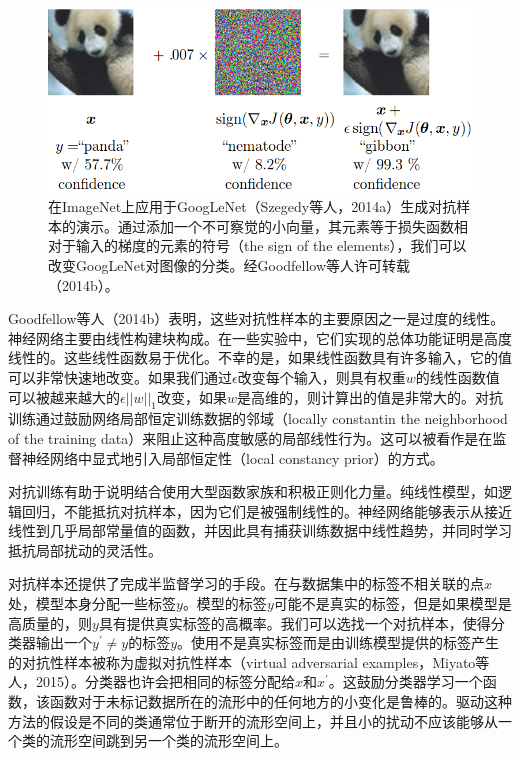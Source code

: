 \begin{figure}[htbp] %
   \centering
   \includegraphics[width=5in]{fig/chap7/7_8.png} 
   \caption{在ImageNet上应用于GoogLeNet（Szegedy等人，2014a）生成对抗样本的演示。通过添加一个不可察觉的小向量，其元素等于损失函数相对于输入的梯度的元素的符号（the sign of the elements），我们可以改变GoogLeNet对图像的分类。经Goodfellow等人许可转载（2014b）。}
   \label{fig:7_8}
\end{figure}

Goodfellow等人（2014b）表明，这些对抗性样本的主要原因之一是过度的线性。神经网络主要由线性构建块构成。在一些实验中，它们实现的总体功能证明是高度线性的。这些线性函数易于优化。不幸的是，如果线性函数具有许多输入，它的值可以非常快速地改变。如果我们通过$\epsilon $改变每个输入，则具有权重$w$的线性函数值可以被越来越大的$\epsilon ||w||_1$改变，如果$w$是高维的，则计算出的值是非常大的。对抗训练通过鼓励网络局部恒定训练数据的邻域（locally constantin the neighborhood of the training data）来阻止这种高度敏感的局部线性行为。这可以被看作是在监督神经网络中显式地引入局部恒定性（local constancy prior）的方式。

对抗训练有助于说明结合使用大型函数家族和积极正则化力量。纯线性模型，如逻辑回归，不能抵抗对抗样本，因为它们是被强制线性的。神经网络能够表示从接近线性到几乎局部常量值的函数，并因此具有捕获训练数据中线性趋势，并同时学习抵抗局部扰动的灵活性。

对抗样本还提供了完成半监督学习的手段。在与数据集中的标签不相关联的点$x$处，模型本身分配一些标签$y$。模型的标签$y$可能不是真实的标签，但是如果模型是高质量的，则$y$具有提供真实标签的高概率。我们可以选找一个对抗样本，使得分类器输出一个$y^{'} \neq y$的标签$y$。使用不是真实标签而是由训练模型提供的标签产生的对抗性样本被称为虚拟对抗性样本（virtual adversarial examples，Miyato等人，2015）。分类器也许会把相同的标签分配给$x$和$x^{'}$。这鼓励分类器学习一个函数，该函数对于未标记数据所在的流形中的任何地方的小变化是鲁棒的。驱动这种方法的假设是不同的类通常位于断开的流形空间上，并且小的扰动不应该能够从一个类的流形空间跳到另一个类的流形空间上。


